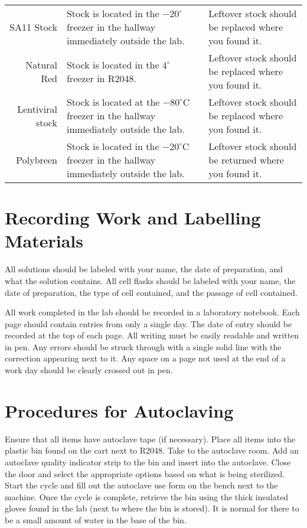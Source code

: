 \begin{tabular*}{\textwidth}{r | p{2in} p{2in}}
SA11 Stock & Stock is located in the $-20^{\circ}$ freezer in the hallway immediately outside the lab. & Leftover stock should be replaced where you found it.\\
Natural Red & Stock is located in the $4^{\circ}$ freezer in R2048. & Leftover stock should be replaced where you found it.\\
Lentiviral stock & Stock is located at the $-80^{\circ}$C freezer in the hallway immediately outside the lab. & Leftover stock should be replaced where you found it. \\
Polybreen & Stock is located in the $-20^{\circ}$C freezer in the hallway immediately outside the lab. & Leftover stock should be returned where you found it.\\
\hline
\end{tabular*}

\section{Recording Work and Labelling Materials}

All solutions should be labeled with your name, the date of preparation, and what the solution contains. All cell flasks should be labeled with your name, the date of preparation, the type of cell contained, and the passage of cell contained.

All work completed in the lab should be recorded in a laboratory notebook. Each page should contain entries from only a single day. The date of entry should be recorded at the top of each page. All writing must be easily readable and written in pen. Any errors should be struck through with a single solid line with the correction appearing next to it. Any space on a page not used at the end of a work day should be clearly crossed out in pen.

\section{Procedures for Autoclaving}

Ensure that all items have autoclave tape (if necessary). Place all items into the plastic bin found on the cart next to R2048. Take to the autoclave room. Add an autoclave quality indicator strip to the bin and insert into the autoclave. Close the door and select the appropriate options based on what is being sterilized. Start the cycle and fill out the autoclave use form on the bench next to the machine. Once the cycle is complete, retrieve the bin using the thick insulated gloves found in the lab (next to where the bin is stored). It is normal for there to be a small amount of water in the base of the bin.

